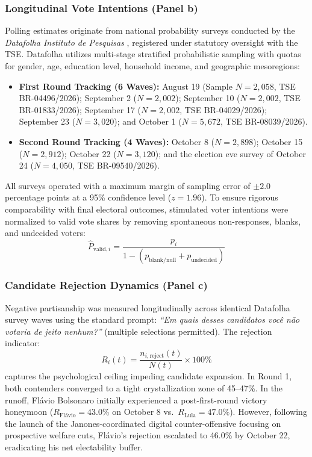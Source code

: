 \subsubsection*{Longitudinal Vote Intentions (Panel b)}
Polling estimates originate from national probability surveys conducted by the \emph{Datafolha Instituto de Pesquisas} \citep{datafolha2026r1,datafolha2026r2}, registered under statutory oversight with the TSE. Datafolha utilizes multi-stage stratified probabilistic sampling with quotas for gender, age, education level, household income, and geographic mesoregions:
\begin{itemize}
    \item \textbf{First Round Tracking (6 Waves):} August 19 (Sample $N=2,058$, TSE BR-04496/2026); September 2 ($N=2,002$); September 10 ($N=2,002$, TSE BR-01833/2026); September 17 ($N=2,002$, TSE BR-04029/2026); September 23 ($N=3,020$); and October 1 ($N=5,672$, TSE BR-08039/2026).
    \item \textbf{Second Round Tracking (4 Waves):} October 8 ($N=2,898$); October 15 ($N=2,912$); October 22 ($N=3,120$); and the election eve survey of October 24 ($N=4,050$, TSE BR-09540/2026).
\end{itemize}
All surveys operated with a maximum margin of sampling error of $\pm 2.0$ percentage points at a 95\% confidence level ($z = 1.96$). To ensure rigorous comparability with final electoral outcomes, stimulated voter intentions were normalized to valid vote shares by removing spontaneous non-responses, blanks, and undecided voters:
\begin{equation}
\hat{P}_{\text{valid}, i} = \frac{p_i}{1 - (p_{\text{blank/null}} + p_{\text{undecided}})}
\end{equation}

\subsubsection*{Candidate Rejection Dynamics (Panel c)}
Negative partisanship was measured longitudinally across identical Datafolha survey waves using the standard prompt: \emph{``Em quais desses candidatos voc{\^e} n{\~a}o votaria de jeito nenhum?''} (multiple selections permitted). The rejection indicator:
\begin{equation}
R_i(t) = \frac{n_{i,\text{reject}}(t)}{N(t)} \times 100\%
\end{equation}
captures the psychological ceiling impeding candidate expansion. In Round 1, both contenders converged to a tight crystallization zone of 45--47\%. In the runoff, Fl{\'a}vio Bolsonaro initially experienced a post-first-round victory honeymoon ($R_{\text{Fl{\'a}vio}} = 43.0\%$ on October 8 vs.\ $R_{\text{Lula}} = 47.0\%$). However, following the launch of the Janones-coordinated digital counter-offensive focusing on prospective welfare cuts, Fl{\'a}vio's rejection escalated to 46.0\% by October 22, eradicating his net electability buffer.

